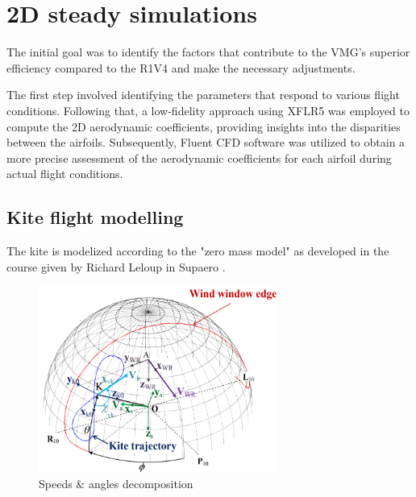 
\chapter{2D steady simulations} 	%
\label{Chapter1} 		%


The initial goal was to identify the factors that contribute to the VMG's superior efficiency compared to the R1V4 and make the necessary adjustments.

The first step involved identifying the parameters that respond to various flight conditions. Following that, a low-fidelity approach using XFLR5 was employed to compute the 2D aerodynamic coefficients, providing insights into the disparities between the airfoils. Subsequently, Fluent CFD software was utilized to obtain a more precise assessment of the aerodynamic coefficients for each airfoil during actual flight conditions.


\section{Kite flight modelling}
\label{sec:Ch1.1}

The kite is modelized according to the "zero mass model" as developed in the course given by Richard Leloup in Supaero \cite{cours_leloup}.

\begin{figure}[H]
    \centering
    \includegraphics[width=0.7\textwidth]{figures/2D steady simulations/kite flight modeling 1.png}
    \caption{Speeds \& angles decomposition}
    \label{fig:Kite_flight_modelling}
\end{figure}

